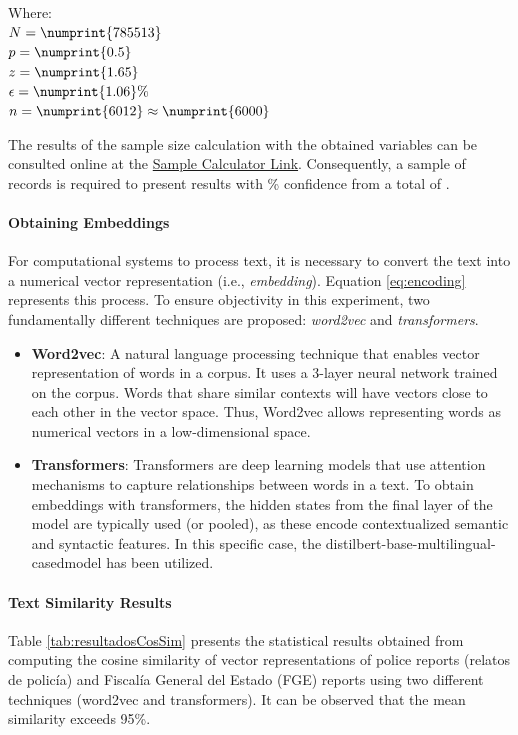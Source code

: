 \documentclass[onecolumn, journal, english, 12pt, a4paper]{IEEEtran} %
\newcommand{\modelohuggingface}{distilbert-base-multilingual-cased}
\theoremstyle{definition}
\begin{document}
Where:\\
$N = \numprint{785513}$ \\
$p = \numprint{0.5}$ \\
$z = \numprint{1.65}$  \\
$\epsilon = \numprint{1.06}\%$ \\
$n = \numprint{6012} \approx \numprint{6000}$

The results of the sample size calculation with the obtained variables
can be consulted online at the
\href{https://www.calculator.net/sample-size-calculator.html?type=1&cl=90&ci=1.06&pp=50&ps=785513&x=Calculate}{Sample
  Calculator Link}. Consequently, a sample of  records
is required to present results with \% confidence from a
total of .

\paragraph{Obtaining Embeddings}  
For computational systems to process text, it is necessary to convert
the text into a numerical vector representation (i.e.,
\emph{embedding}). Equation \eqref{eq:encoding} represents this
process. To ensure objectivity in this experiment, two fundamentally
different techniques are proposed: \emph{word2vec} and
\emph{transformers}.

\begin{itemize}
\item \textbf{Word2vec}: A natural language processing technique that
  enables vector representation of words in a corpus. It uses a
  3-layer neural network trained on the corpus. Words that share
  similar contexts will have vectors close to each other in the vector
  space. Thus, Word2vec allows representing words as numerical vectors
  in a low-dimensional space.

\item \textbf{Transformers}: Transformers are deep learning models
  that use attention mechanisms to capture relationships between words
  in a text. To obtain embeddings with transformers, the hidden states
  from the final layer of the model are typically used (or pooled), as
  these encode contextualized semantic and syntactic features. In this
  specific case, the \modelohuggingface model has been utilized.
\end{itemize}

\paragraph{Text Similarity Results}
Table \ref{tab:resultadosCosSim} presents the statistical results
obtained from computing the cosine similarity of vector
representations of police reports (relatos de policía) and Fiscalía
General del Estado (FGE) reports using two different techniques
(word2vec and transformers). It can be observed that the mean
similarity exceeds 95\%.
\end{document}
